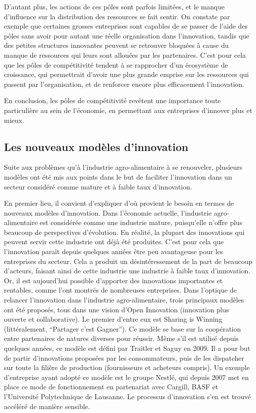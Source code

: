 \documentclass[a4paper,10pt]{report}
\begin{document}
		D’autant plus, les actions de ces pôles sont parfois limitées, et le manque d’influence sur la distribution des ressources se fait sentir. On constate par exemple que certaines grosses entreprises sont capables de se passer de l’aide des pôles sans avoir pour autant une réelle organisation dans l’innovation, tandis que des petites structures innovantes peuvent se retrouver bloquées à cause du manque de ressources qui leurs sont allouées par les partenaires.
		C’est pour cela que les pôles de compétitivité tendent à se rapprocher d’un écosystème de croissance, qui permettrait d’avoir une plus grande emprise sur les ressources qui passent par l’organisation, et de renforcer encore plus efficacement l’innovation.
		
		En conclusion, les pôles de compétitivité revêtent une importance toute particulière au sein de l’économie, en permettant aux entreprises d’innover plus et mieux.
				
		\subsection{Les nouveaux modèles d’innovation}
			Suite aux problèmes qu’à l’industrie agro-alimentaire à se renouveler, plusieurs modèles ont été mis aux points dans le but de faciliter l’innovation dans un secteur considéré comme mature et à faible taux d’innovation.
			
			En premier lieu, il convient d’expliquer d’où provient le besoin en termes de nouveaux modèles d’innovation. Dans l’économie actuelle, l’industrie agro-alimentaire est considérée comme une industrie mature, puisqu’elle n’offre plus beaucoup de perspectives d’évolution. En réalité, la plupart des innovations qui peuvent servir cette industrie ont déjà été produites. C’est pour cela que l’innovation paraît depuis quelques années être peu avantageuse pour les entreprises du secteur. Cela a produit un désintéressement de la part de beaucoup d’acteurs, faisant ainsi de cette industrie une industrie à faible taux d’innovation. Or, il est aujourd’hui possible d’apporter des innovations importantes et rentables, comme l’ont montrés de nombreuses entreprises.
			Dans l’optique de relancer l’innovation dans l’industrie agro-alimentaire, trois principaux modèles ont été proposés, tous dans une vision d’Open Innovation (innovation plus ouverte et collaborative)\cite{OpenInnovation}. Le premier d’entre eux est Sharing is Winning (littéralement, “Partager c’est Gagner”)\cite{SiW}. Ce modèle se base sur la coopération entre partenaires de natures diverses pour réussir. Même s’il est utilisé depuis quelques années, ce modèle est défini par Traitler et Saguy en 2009. Il a pour but de partir d’innovations proposées par les consommateurs, puis de les dispatcher sur toute la filière de production (fournisseurs et acheteurs compris)\cite{OIFr}. Un exemple d’entreprise ayant adopté ce modèle est le groupe Nestlé\cite{NestleOI}, qui depuis 2007 met en place ce mode de fonctionnement en partenariat avec Cargill, BASF et l'Université Polytechnique de Lausanne. Le processus d’innovation s’en est trouvé accéléré de manière sensible.	
			
\end{document}
